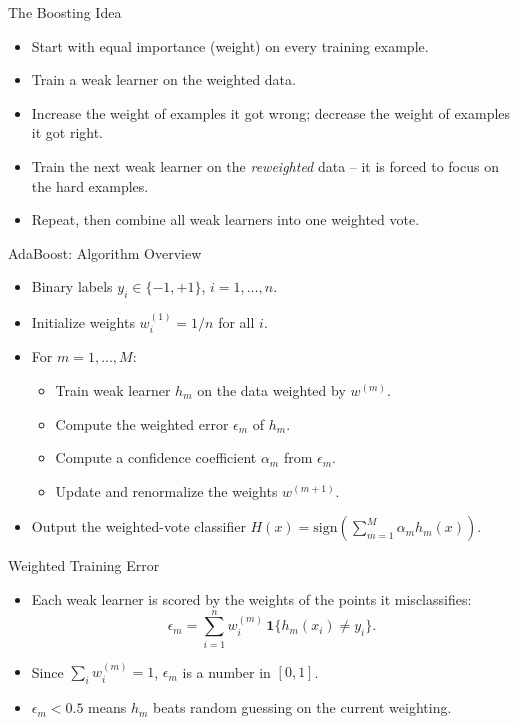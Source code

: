 \begin{frame}{The Boosting Idea}
\begin{itemize}
  \item Start with equal importance (weight) on every training example.
  \pause
  \item Train a weak learner on the weighted data.
  \pause
  \item Increase the weight of examples it got wrong; decrease the weight of examples it got right.
  \pause
  \item Train the next weak learner on the \emph{reweighted} data -- it is forced to focus on the hard examples.
  \pause
  \item Repeat, then combine all weak learners into one weighted vote.
\end{itemize}
\end{frame}

\begin{frame}{AdaBoost: Algorithm Overview}
\begin{itemize}
  \item Binary labels $y_i \in \{-1,+1\}$, $i=1,\dots,n$.
  \pause
  \item Initialize weights $w_i^{(1)} = 1/n$ for all $i$.
  \pause
  \item For $m = 1,\dots,M$:
  \begin{itemize}
    \item Train weak learner $h_m$ on the data weighted by $w^{(m)}$.
    \item Compute the weighted error $\epsilon_m$ of $h_m$.
    \item Compute a confidence coefficient $\alpha_m$ from $\epsilon_m$.
    \item Update and renormalize the weights $w^{(m+1)}$.
  \end{itemize}
  \pause
  \item Output the weighted-vote classifier $H(x) = \mathrm{sign}\!\left(\sum_{m=1}^{M}\alpha_m h_m(x)\right)$.
\end{itemize}
\end{frame}

\begin{frame}{Weighted Training Error}
\begin{itemize}
  \item Each weak learner is scored by the weights of the points it misclassifies:
  \begin{equation}
    \epsilon_m = \sum_{i=1}^{n} w_i^{(m)}\,\mathbf{1}\{h_m(x_i) \neq y_i\}.
    \label{eq:weighted-error}
  \end{equation}
  \pause
  \item Since $\sum_i w_i^{(m)} = 1$, $\epsilon_m$ is a number in $[0,1]$.
  \pause
  \item $\epsilon_m < 0.5$ means $h_m$ beats random guessing on the current weighting.
\end{itemize}
\end{frame}


